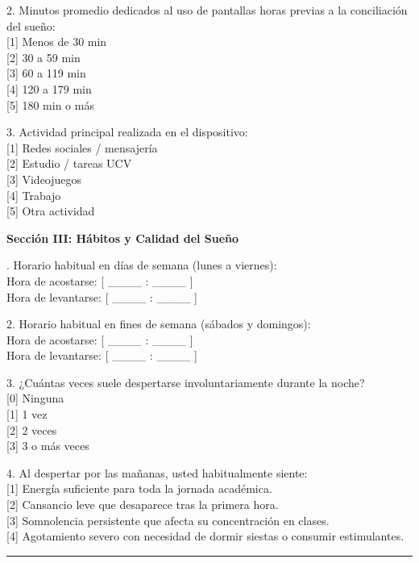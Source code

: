 \documentclass[12pt, letterpaper]{article}
\begin{document}
\begin{singlespace}
2. Minutos promedio dedicados al uso de pantallas horas previas a la conciliación del sueño:\\
{[1]} Menos de 30 min\\
{[2]} 30 a 59 min\\
{[3]} 60 a 119 min\\
{[4]} 120 a 179 min\\
{[5]} 180 min o más\par\smallskip

3. Actividad principal realizada en el dispositivo:\\
{[1]} Redes sociales / mensajería\\
{[2]} Estudio / tareas UCV\\
{[3]} Videojuegos\\
{[4]} Trabajo\\
{[5]} Otra actividad\par\medskip

\textbf{Sección III: Hábitos y Calidad del Sueño}\par{}. Horario habitual en días de semana (lunes a viernes):\\
Hora de acostarse: {[ \_\_\_\_ : \_\_\_\_ ]}\\
Hora de levantarse: {[ \_\_\_\_ : \_\_\_\_ ]}\par\smallskip

2. Horario habitual en fines de semana (sábados y domingos):\\
Hora de acostarse: {[ \_\_\_\_ : \_\_\_\_ ]}\\
Hora de levantarse: {[ \_\_\_\_ : \_\_\_\_ ]}\par\smallskip

3. ¿Cuántas veces suele despertarse involuntariamente durante la noche?\\
{[0]} Ninguna\\
{[1]} 1 vez\\
{[2]} 2 veces\\
{[3]} 3 o más veces\par\smallskip

4. Al despertar por las mañanas, usted habitualmente siente:\\
{[1]} Energía suficiente para toda la jornada académica.\\
{[2]} Cansancio leve que desaparece tras la primera hora.\\
{[3]} Somnolencia persistente que afecta su concentración en clases.\\
{[4]} Agotamiento severo con necesidad de dormir siestas o consumir estimulantes.\par\smallskip
\noindent\rule{\textwidth}{0.4pt}
\end{singlespace}
\end{document}
